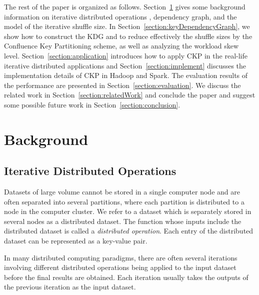 \documentclass[10pt,journal,compsoc]{IEEEtran}
\begin{document}
The rest of the paper is organized as follows. Section~\ref{section:background}
gives some background information on iterative distributed operations
, dependency graph, and the model of the iterative shuffle size.
In Section~\ref{section:keyDependencyGraph}, we show how to construct
the KDG and to reduce effectively the shuffle sizes by the Confluence Key
Partitioning scheme, as well as analyzing the workload skew level.
Section~\ref{section:application} introduces how to apply CKP in
the real-life iterative distributed applications 
and Section~\ref{section:implement} discusses the
implementation details of CKP in Hadoop and Spark.
The evaluation results of the performance are presented in Section~\ref{section:evaluation}. 
We discuss the related work in Section~\ref{section:relatedWork} and
conclude the paper and suggest some possible future work in
Section~\ref{section:conclusion}.


\section{Background}\label{section:background}
\subsection{Iterative Distributed Operations}
Datasets of large volume cannot be stored in a single computer node
and are often separated into several partitions, 
where each partition is distributed to a node in the computer cluster. 
We refer to a dataset which is separately stored in several nodes as a distributed dataset. 
The function whose inputs include the distributed dataset is called a \emph{distributed operation}.
Each entry of the distributed dataset can be represented as a key-value pair. 

In many distributed computing paradigms, there are often several
iterations involving different distributed operations being applied
to the input dataset before the final results are obtained. 
Each iteration usually takes the outputs of the previous iteration as
the input dataset.
\end{document}

